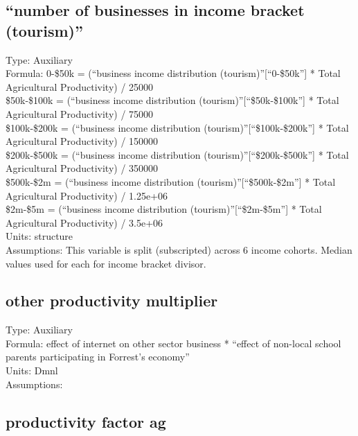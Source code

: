 \documentclass[
  11pt,
]{book}
\begin{document}
\hypertarget{number-of-businesses-in-income-bracket-tourism}{%
\subsection{``number of businesses in income bracket (tourism)''}\label{number-of-businesses-in-income-bracket-tourism}}

Type: Auxiliary\\
Formula: 0-\$50k = (``business income distribution (tourism)''{[}``0-\$50k''{]} * Total Agricultural Productivity) / 25000\\
\$50k-\$100k = (``business income distribution (tourism)''{[}``\$50k-\$100k''{]} * Total Agricultural Productivity) / 75000\\
\$100k-\$200k = (``business income distribution (tourism)''{[}``\$100k-\$200k''{]} * Total Agricultural Productivity) / 150000\\
\$200k-\$500k = (``business income distribution (tourism)''{[}``\$200k-\$500k''{]} * Total Agricultural Productivity) / 350000\\
\$500k-\$2m = (``business income distribution (tourism)''{[}``\$500k-\$2m''{]} * Total Agricultural Productivity) / 1.25e+06\\
\$2m-\$5m = (``business income distribution (tourism)''{[}``\$2m-\$5m''{]} * Total Agricultural Productivity) / 3.5e+06\\
Units: structure\\
Assumptions: This variable is split (subscripted) across 6 income cohorts. Median values used for each for income bracket divisor.

\hypertarget{other-productivity-multiplier}{%
\subsection{other productivity multiplier}\label{other-productivity-multiplier}}

Type: Auxiliary\\
Formula: effect of internet on other sector business * ``effect of non-local school parents participating in Forrest's economy''\\
Units: Dmnl\\
Assumptions:

\hypertarget{productivity-factor-ag}{%
\subsection{productivity factor ag}\label{productivity-factor-ag}}
\end{document}

